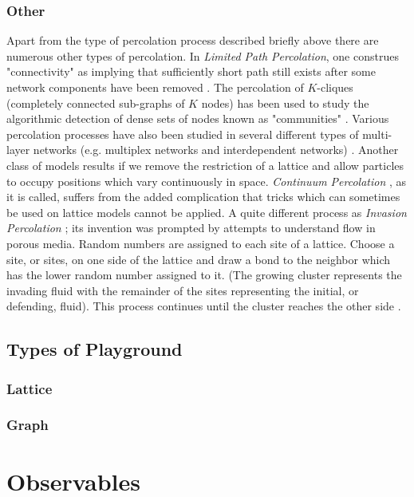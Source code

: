 		\subsubsection{Other}
		Apart from the type of percolation process described briefly above there are numerous other types of percolation. In \textit{Limited Path Percolation}, one construes "connectivity" as implying that sufficiently short path still exists after some network components have been removed \cite{Lpez2007}. The percolation of $K$-cliques (completely connected sub-graphs of $K$ nodes) has been used to study the algorithmic detection of dense sets of nodes known as "communities" \cite{Palla2005}. Various percolation processes have also been studied in several different types of multi-layer networks (e.g. multiplex networks and interdependent networks) \cite{Boccaletti2014, Kivela2014}. Another class of models results if we remove the restriction of a lattice and allow particles to occupy positions which vary continuously in space. \textit{Continuum Percolation} \cite{Hall1985,Penrose1998,Bogu2009}, as it is called, suffers from the added complication that tricks which can sometimes be used on lattice models cannot be applied. A quite different process as \textit{Invasion Percolation} \cite{Furuberg1996,Mloy1992, Wilkinson1983}; its invention was prompted by attempts to understand flow in porous media. Random numbers are assigned to each site of a lattice. Choose a site, or sites, on one side of the lattice and draw a bond to the neighbor which has the lower random number assigned to it. (The growing cluster represents the invading fluid with the remainder of the sites representing the initial, or defending, fluid). This process continues until the cluster reaches the other side \cite{Lenormand1985}.
	\subsection{Types of Playground}
		\subsubsection{Lattice}
		\subsubsection{Graph}
\section{Observables}
